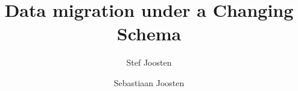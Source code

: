 \documentclass{elsarticle}
\begin{document}





\title{Data migration under a Changing Schema}
\author[ou,ordina]{Stef Joosten}
\author[umn]{Sebastiaan Joosten}
\address[ou]{Open Universiteit Nederland, Heerlen, the Netherlands}
\address[ordina]{Ordina NV, Nieuwegein, the Netherlands}
\address[umn]{University of Minnesota, Minneapolis, USA}
\end{document}
